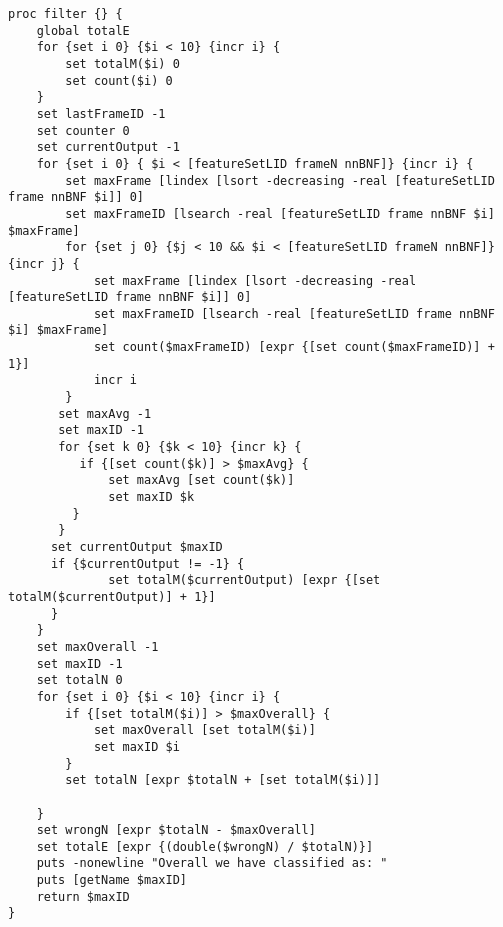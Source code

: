 \begin{lstlisting}[label=lst:CountingFilter,caption=Counting Filter employed to smooth/improve output]
proc filter {} {
    global totalE
    for {set i 0} {$i < 10} {incr i} {
        set totalM($i) 0
        set count($i) 0
    }
    set lastFrameID -1
    set counter 0
    set currentOutput -1
    for {set i 0} { $i < [featureSetLID frameN nnBNF]} {incr i} {
        set maxFrame [lindex [lsort -decreasing -real [featureSetLID frame nnBNF $i]] 0]
        set maxFrameID [lsearch -real [featureSetLID frame nnBNF $i] $maxFrame]
        for {set j 0} {$j < 10 && $i < [featureSetLID frameN nnBNF]} {incr j} {
            set maxFrame [lindex [lsort -decreasing -real [featureSetLID frame nnBNF $i]] 0]
            set maxFrameID [lsearch -real [featureSetLID frame nnBNF $i] $maxFrame]
            set count($maxFrameID) [expr {[set count($maxFrameID)] + 1}]
            incr i
        }
       set maxAvg -1
       set maxID -1
       for {set k 0} {$k < 10} {incr k} {
          if {[set count($k)] > $maxAvg} {
              set maxAvg [set count($k)]
              set maxID $k
         }
       }
      set currentOutput $maxID
      if {$currentOutput != -1} {
              set totalM($currentOutput) [expr {[set totalM($currentOutput)] + 1}]
      }
    }
    set maxOverall -1
    set maxID -1
    set totalN 0
    for {set i 0} {$i < 10} {incr i} {
        if {[set totalM($i)] > $maxOverall} {
            set maxOverall [set totalM($i)]
            set maxID $i
        }
        set totalN [expr $totalN + [set totalM($i)]]

    }
    set wrongN [expr $totalN - $maxOverall]
    set totalE [expr {(double($wrongN) / $totalN)}]
    puts -nonewline "Overall we have classified as: "
    puts [getName $maxID]
    return $maxID
}
\end{lstlisting}
\newpage
